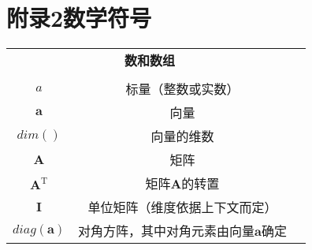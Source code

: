 \clearpage
{}
\section*{附录2\quad{}数学符号}
\begin{center}
    \begin{tabular}{ccc}
        \multicolumn{2}{c}{\textbf{数和数组}}              \\
        \\
        $a$                 & 标量（整数或实数）                \\
        $\bm{a}$            & 向量                       \\
        $dim()$             & 向量的维数                    \\
        $\bm{A}$            & 矩阵                       \\
        $\bm{A}^\mathrm{T}$ & 矩阵$\textbf{A}$的转置        \\
        $\bm{I}$            & 单位矩阵（维度依据上下文而定）          \\
        $diag(\bm{a})$      & 对角方阵，其中对角元素由向量$\bm{a}$确定 \\
    \end{tabular}
\end{center}